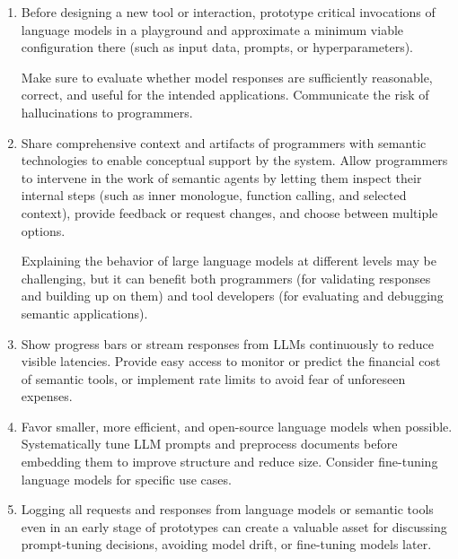 \begin{enumerate}
	\item {}
	Before designing a new tool or interaction, prototype critical invocations of language models in a playground and approximate a minimum viable configuration there (such as input data, prompts, or hyperparameters).

	Make sure to evaluate whether model responses are sufficiently reasonable, correct, and useful for the intended applications.
	Communicate the risk of hallucinations to programmers.

	\item {}
	Share comprehensive context and artifacts of programmers with semantic technologies to enable conceptual support by the system.
	Allow programmers to intervene in the work of semantic agents by letting them inspect their internal steps (such as inner monologue, function calling, and selected context), provide feedback or request changes, and choose between multiple options.

	Explaining the behavior of large language models at different levels may be challenging, but it can benefit both programmers (for validating responses and building up on them) and tool developers (for evaluating and debugging semantic applications).

	\item {}
	Show progress bars or stream responses from LLMs continuously to reduce visible latencies.
	Provide easy access to monitor or predict the financial cost of semantic tools, or implement rate limits to avoid fear of unforeseen expenses.

	\item {}
	Favor smaller, more efficient, and open-source language models when possible.
	Systematically tune LLM prompts and preprocess documents before embedding them to improve structure and reduce size.
	Consider fine-tuning language models for specific use cases.

	\item {}
	Logging all requests and responses from language models or semantic tools even in an early stage of prototypes can create a valuable asset for discussing prompt-tuning decisions, avoiding model drift, or fine-tuning models later.


\end{enumerate}
